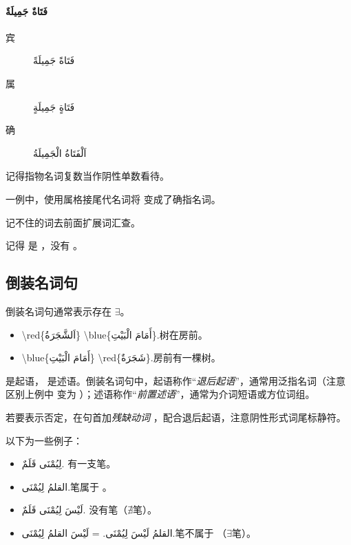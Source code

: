 \begin{Arabic}
\begin{multicols}{3}
    \begin{minipage}{\linewidth}
    \paragraph{فَتَاةٌ جَمِيلَةٌ}
    \begin{description}
        \item [宾] فَتَاةً جَمِيلَةً
        \item [属] فَتَاةٍ جَمِيلَةٍ
        \item [确] اَلْفَتَاةُ الْجَمِيلَةُ 
    \end{description}
    \end{minipage}
    \end{multicols}
\end{Arabic}


\begin{attention}
    记得指物名词复数当作阴性单数看待。

     一例中，使用属格接尾代名词将  变成了确指名词。
\end{attention}

\begin{note}
    记不住的词去前面扩展词汇查。

    记得  是  ，没有 。
\end{note}

\subsection{ 倒装名词句}

倒装名词句通常表示存在 $\exists$。

\begin{itemize}
    \item \ac{\red{اَلشَّجَرَةُ} \blue{أَمَامَ الْبَيْتِ}.}{树在房前。}
    \item \ac{\blue{أَمَامَ الْبَيْتِ} \red{شَجَرَةٌ}.}{房前有一棵树。}
\end{itemize}

 是起语， 是述语。倒装名词句中，起语称作``\emph{退后起语}''，通常用泛指名词（注意区别上例中  变为 ）；述语称作``\emph{前置述语}''，通常为介词短语或方位词组。

若要表示否定，在句首加\emph{残缺动词}  ，配合退后起语，注意阴性形式词尾标静符。

以下为一些例子：

\begin{itemize}
    \item \ac{لِيُمْنَى قَلَمٌ.}{ 有一支笔。}
    \item \ac{القلمُ لِيُمْنَى.}{笔属于 。}
    \item \ac{لَيْسَ لِيُمْنَى قَلَمٌ.}{ 没有笔（$\nexists$笔）。}
    \item \ac{القلمُ لَيْسَ لِيُمْنَى. = لَيْسَ القلمُ لِيُمْنَى.}{笔不属于 （$\exists$笔）。}
\end{itemize}

